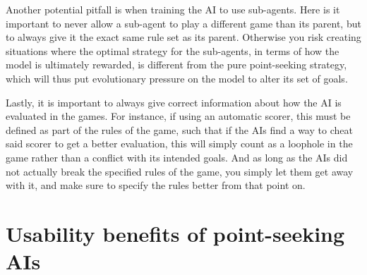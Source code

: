 \documentclass{article}
\begin{document}


Another potential pitfall is when training the AI to use sub-agents. Here is it important to never allow a sub-agent to play a different game than its parent, but to always give it the exact same rule set as its parent. Otherwise you risk creating situations where the optimal strategy for the sub-agents, in terms of how the model is ultimately rewarded, is different from the pure point-seeking strategy, which will thus put evolutionary pressure on the model to alter its set of goals.


Lastly, it is important to always give correct information about how the AI is evaluated in the games. For instance, if using an automatic scorer, this must be defined as part of the rules of the game, such that if the AIs find a way to cheat said scorer to get a better evaluation, this will simply count as a loophole in the game rather than a conflict with its intended goals. And as long as the AIs did not actually break the specified rules of the game, you simply let them get away with it, and make sure to specify the rules better from that point on.









\section{Usability benefits of point-seeking AIs}
\end{document}
